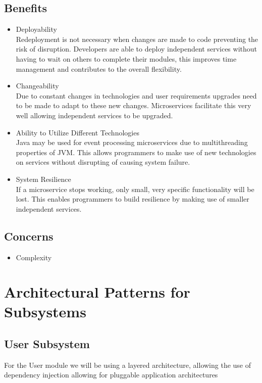 \documentclass{article}
\begin{document}
 		\subsection{Benefits}
 			\begin{itemize}
 				\item Deployability
 				\bigskip
 				\\
 				Redeployment is not necessary when changes are made to code preventing the risk of disruption.
 				Developers are able to deploy independent services without having to wait on others to complete their modules, this improves time management and contributes to the overall flexibility.
 				\item Changeability
 				\bigskip
 				\\
 				Due to constant changes in technologies and user requirements upgrades need to be made to adapt to these new changes. Microservices  facilitate this very well allowing independent services to be upgraded.
 				\item Ability to Utilize Different Technologies
 				\bigskip
 				\\
 				Java may be used for event processing microservices due to multithreading properties of JVM.
 				This allows programmers to make use of new technologies on services without disrupting of causing system failure.
 				\item System Resilience
 				\bigskip
 				\\
 				If a microservice stops working, only small, very specific functionality will be lost. This enables programmers to build resilience by making use of smaller independent services.
 			\end{itemize}
 		\subsection{Concerns}
 			\begin{itemize}
 				\item Complexity				
 			\end{itemize}
 			\newpage
 			
 			 \section{Architectural Patterns for Subsystems}
				\subsection{User Subsystem}
				For the User module we will be using a layered architecture, allowing the use of dependency injection allowing for pluggable application architectures
\end{document}
